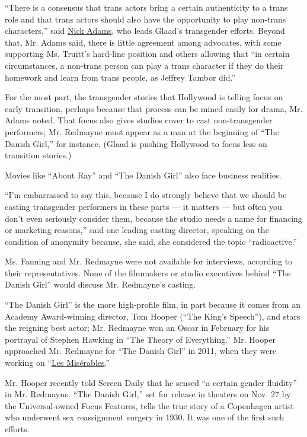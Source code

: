 ``There is a consensus that trans actors bring a certain authenticity to
a trans role and that trans actors should also have the opportunity to
play non-trans characters,'' said
\href{http://www.glaad.org/about/staff/nickadams}{Nick Adams}, who leads
Glaad's transgender efforts. Beyond that, Mr. Adams said, there is
little agreement among advocates, with some supporting Ms. Truitt's
hard-line position and others allowing that ``in certain circumstances,
a non-trans person can play a trans character if they do their homework
and learn from trans people, as Jeffrey Tambor did.''

For the most part, the transgender stories that Hollywood is telling
focus on early transition, perhaps because that process can be mined
easily for drama, Mr. Adams noted. That focus also gives studios cover
to cast non-transgender performers; Mr. Redmayne must appear as a man at
the beginning of ``The Danish Girl,'' for instance. (Glaad is pushing
Hollywood to focus less on transition stories.)

Movies like ``About Ray'' and ``The Danish Girl'' also face business
realities.

``I'm embarrassed to say this, because I do strongly believe that we
should be casting transgender performers in these parts --- it matters
--- but often you don't even seriously consider them, because the studio
needs a name for financing or marketing reasons,'' said one leading
casting director, speaking on the condition of anonymity because, she
said, she considered the topic ``radioactive.''

Ms. Fanning and Mr. Redmayne were not available for interviews,
according to their representatives. None of the filmmakers or studio
executives behind ``The Danish Girl'' would discuss Mr. Redmayne's
casting.

``The Danish Girl'' is the more high-profile film, in part because it
comes from an Academy Award-winning director, Tom Hooper (``The King's
Speech''), and stars the reigning best actor; Mr. Redmayne won an Oscar
in February for his portrayal of Stephen Hawking in ``The Theory of
Everything.'' Mr. Hooper approached Mr. Redmayne for ``The Danish Girl''
in 2011, when they were working on
``\href{http://www.nytimes3xbfgragh.onion/2012/12/25/movies/les-miserables-stars-anne-hathaway-and-hugh-jackman.html}{Les
Misérables}.''

Mr. Hooper recently told Screen Daily that he sensed ``a certain gender
fluidity'' in Mr. Redmayne. ``The Danish Girl,'' set for release in
theaters on Nov. 27 by the Universal-owned Focus Features, tells the
true story of a Copenhagen artist who underwent sex reassignment surgery
in 1930. It was one of the first such efforts.

